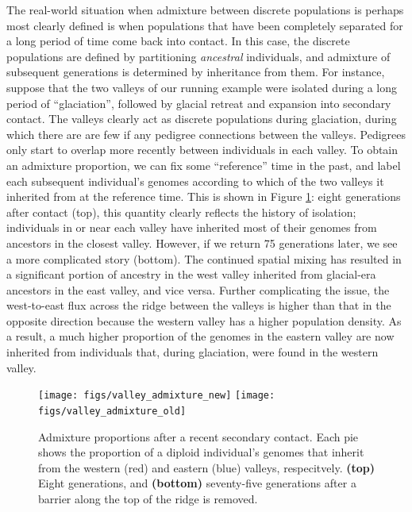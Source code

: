 \documentclass{ar-1col}
\renewcommand{\emph}[1]{{\textit{#1}}}
\begin{document}
The real-world situation when admixture between discrete populations 
is perhaps most clearly defined is when populations that have been completely separated
for a long period of time come back into contact.
In this case, the discrete populations are defined by partitioning \emph{ancestral} individuals,
and admixture of subsequent generations is determined by inheritance from them.
For instance, suppose that 
the two valleys of our running example
were isolated during a long period of ``glaciation'',
followed by glacial retreat and expansion into secondary contact.
The valleys clearly act as discrete populations during glaciation, 
during which there are are few if any pedigree connections between the valleys.
Pedigrees only start to overlap more recently between individuals in each valley.
To obtain an admixture proportion,
we can fix some ``reference'' time in the past,
and label each subsequent individual's genomes
according to which of the two valleys it inherited from at the reference time.
This is shown in Figure \ref{postglacial_expansion}:
eight generations after contact (top),
this quantity clearly reflects the history of isolation;  
individuals in or near each valley have inherited most of their genomes 
from ancestors in the closest valley.
However, if we return 75 generations later, 
we see a more complicated story (bottom).
The continued spatial mixing has resulted in a significant 
portion of ancestry in the west valley inherited from 
glacial-era ancestors in the east valley, 
and vice versa.
Further complicating the issue, 
the west-to-east flux across the ridge between the valleys 
is higher than that in the opposite direction 
because the western valley has a higher population density. 
As a result, a much higher proportion of the genomes
in the eastern valley are now inherited 
from individuals that, 
during glaciation, were found in the western valley.

\begin{figure}	%
    \centering
        \texttt{[image: figs/valley\_admixture\_new]}
        \texttt{[image: figs/valley\_admixture\_old]}
        \caption{
            Admixture proportions after a recent secondary contact.
            Each pie shows the proportion of a diploid individual's genomes
            that inherit from the western (red) and eastern (blue) valleys, respecitvely.
            \textbf{(top)} Eight generations, and
            \textbf{(bottom)} seventy-five generations 
            after a barrier along the top of the ridge is removed.
        }
        \label{postglacial_expansion}
\end{figure}
\end{document}
